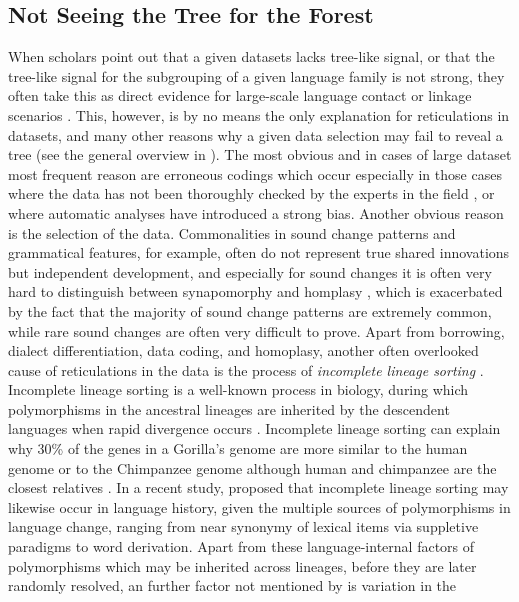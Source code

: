 \documentclass[svgnames,12pt]{scrartcl}
\begin{document}
{\subsection{Not Seeing the Tree for the Forest}
When scholars point out that a given datasets lacks tree-like signal, or that the tree-like signal
for the subgrouping of a given language family is not strong, they often take this as direct
evidence for large-scale language contact or linkage scenarios \citep{Ross1988}.  This, however, is
by no means the only explanation for reticulations in datasets, and many other reasons why a given
data selection may fail to reveal a tree (see the general overview in
\citealt[44-66]{Morrison2011}). The most obvious and in cases of large dataset most frequent reason
are erroneous codings which occur especially in those cases where the data has not been thoroughly
checked by the experts in the field \citep{Geisler2010}, or where automatic analyses have introduced
a strong bias. Another obvious reason is the selection of the data. Commonalities in sound change
patterns and grammatical features, for example, often do not represent true shared innovations but
independent development, and especially for sound changes it is often very hard to distinguish
between synapomorphy and homplasy \citep[182f]{Chacon2015}, which is exacerbated by the fact that
the majority of sound change patterns are extremely common, while rare sound changes are often very
difficult to prove. Apart from borrowing, dialect differentiation, data coding, and homoplasy,
another often overlooked cause of reticulations in the data is the process of \emph{incomplete
lineage sorting} \citep{Galtier2008}. Incomplete lineage sorting is a well-known process in
biology, during which polymorphisms in the ancestral lineages are inherited by the descendent
languages when rapid divergence occurs \citep{Rogers2014}. Incomplete lineage sorting can explain 
why 30\% of the genes in a Gorilla's genome are more similar to the human genome or to the
Chimpanzee genome although human and chimpanzee are the closest relatives \citep{Scally2012}. 
In a recent study, \citet{List2016h} proposed that incomplete lineage sorting may likewise occur in
language history, given  
the multiple sources of polymorphisms in language change, ranging from near synonymy of lexical
items via suppletive paradigms to word derivation.
Apart from these language-internal factors of polymorphisms which may be inherited across lineages,
before they are
later randomly resolved, an further factor not mentioned by \citet{List2016h} is variation in the
}
\end{document}
